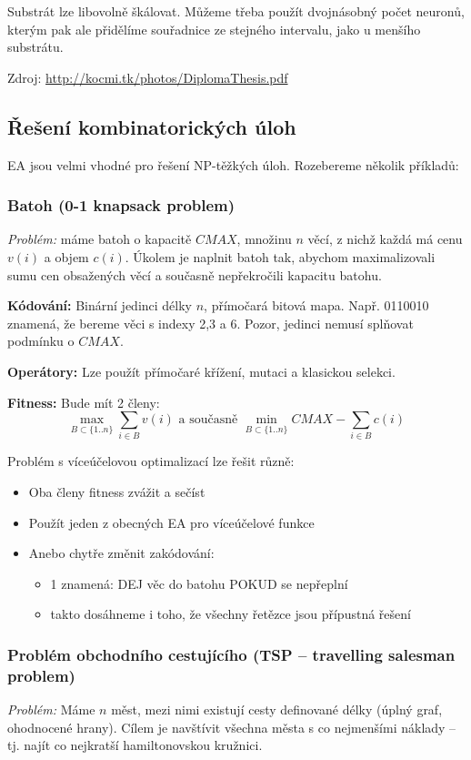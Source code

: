 Substrát lze libovolně škálovat. Můžeme třeba použít dvojnásobný počet neuronů, kterým pak ale přidělíme souřadnice ze stejného intervalu, jako u menšího substrátu.

Zdroj: \url{http://kocmi.tk/photos/DiplomaThesis.pdf}

\subsection{Řešení kombinatorických úloh}
EA jsou velmi vhodné pro řešení NP-těžkých úloh. Rozebereme několik příkladů:

\subsubsection{Batoh (0-1 knapsack problem)}
\textit{Problém:} máme batoh o kapacitě $CMAX$, množinu $n$ věcí, z nichž každá má cenu $v(i)$ a objem $c(i)$. Úkolem je naplnit batoh tak, abychom maximalizovali sumu cen obsažených věcí a současně nepřekročili kapacitu batohu.

\textbf{Kódování:} Binární jedinci délky $n$, přímočará bitová mapa. Např. 0110010 znamená, že bereme věci s indexy 2,3 a 6. Pozor, jedinci nemusí splňovat podmínku o $CMAX$.

\textbf{Operátory:} Lze použít přímočaré křížení, mutaci a klasickou selekci.

\textbf{Fitness:} Bude mít 2 členy: 
$$\max\limits_{B \subset \{1..n\}} \sum\limits_{i \in B} v(i) \text{\ \ a současně\ \ } \min\limits_{B \subset \{1..n\}} CMAX - \sum\limits_{i \in B} c(i)$$

Problém s víceúčelovou optimalizací lze řešit různě:
\begin{itemize}
	
	
	\item Oba členy fitness zvážit a sečíst
	\item Použít jeden z obecných EA pro víceúčelové funkce
	\item Anebo chytře změnit zakódování:
	\begin{itemize}	
		
		
		\item 1 znamená: DEJ věc do batohu POKUD se nepřeplní
		\item takto dosáhneme i toho, že všechny řetězce jsou přípustná řešení
	\end{itemize}
\end{itemize}

\subsubsection{Problém obchodního cestujícího (TSP -- travelling salesman problem)}
\textit{Problém:} Máme $n$ měst, mezi nimi existují cesty definované délky (úplný graf, ohodnocené hrany). Cílem je navštívit všechna města s co nejmenšími náklady -- tj. najít co nejkratší hamiltonovskou kružnici.

